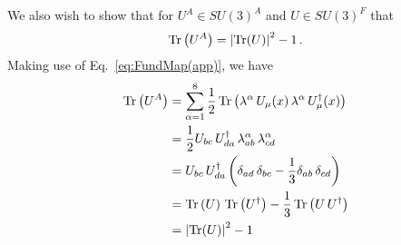 We also wish to show that for $U^A\in SU(3)^A$ and $U\in SU(3)^F$ that
%
\begin{equation}
\operatorname{Tr}\left(U^A\right) = \left|\operatorname{Tr}(U)\right|^2 -1\, .
\end{equation}
%
Making use of Eq.~\eqref{eq:FundMap(app)}, we have
\begin{align}
\operatorname{Tr}\left(U^A\right) &= \sum_{\alpha=1}^8 \frac{1}{2}\operatorname{Tr}\left(\lambda^\alpha \, U_\mu(x) \, \lambda^\alpha \, U_\mu^\dagger(x)\right)\nonumber\\
&= \frac{1}{2}U_{bc} \, U^\dagger_{da} \, \lambda_{ab}^\alpha \, \lambda_{cd}^\alpha\nonumber\\
&= U_{bc} \, U^\dagger_{da} \left(\delta_{ad}\,\delta_{bc} - \frac{1}{3}\delta_{ab}\,\delta_{cd}\right)\nonumber\\
&= \operatorname{Tr}\left(U\right) \, \operatorname{Tr}\left( U^\dagger \right) - \frac{1}{3}\operatorname{Tr}\left(U\, U^\dagger\right)\nonumber\\
&= \left|\operatorname{Tr}(U)\right|^2 -1
\end{align}

